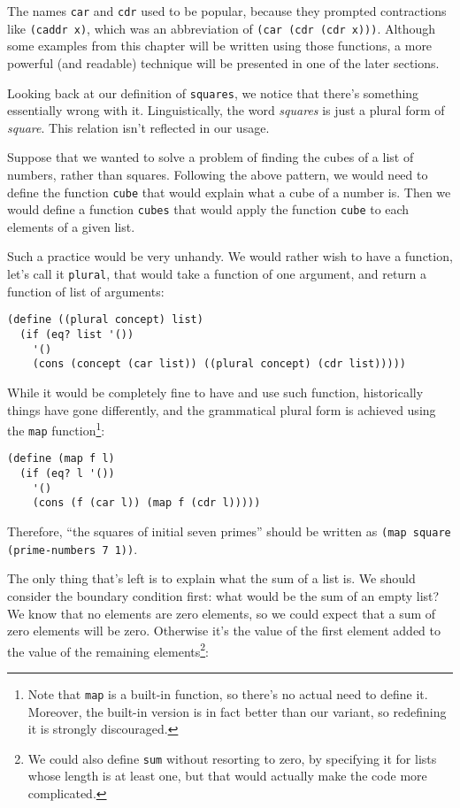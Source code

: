 The names \texttt{car} and \texttt{cdr} used to be popular, because
they prompted contractions like \texttt{(caddr x)}, which was an
abbreviation of \texttt{(car (cdr (cdr x)))}. Although some examples
from this chapter will be written using those functions, a more
powerful (and readable) technique will be presented in one of
the later sections.

Looking back at our definition of \texttt{squares}, we notice
that there's something essentially wrong with it. Linguistically,
the word \textit{squares} is just a plural form of \textit{square}.
This relation isn't reflected in our usage.

Suppose that we wanted to solve a problem of finding the cubes
of a list of numbers, rather than squares. Following the above
pattern, we would need to define the function \texttt{cube} that
would explain what a cube of a number is. Then we would define
a function \texttt{cubes} that would apply the function \texttt{cube}
to each elements of a given list.

Such a practice would be very unhandy. We would rather wish to
have a function, let's call it \texttt{plural}, that would take
a function of one argument, and return a function of list of
arguments:

\begin{Verbatim}[samepage=true]
(define ((plural concept) list)
  (if (eq? list '())
    '()
    (cons (concept (car list)) ((plural concept) (cdr list)))))
\end{Verbatim}

While it would be completely fine to have and use such function,
historically things have gone differently, and the grammatical plural
form is achieved using the \texttt{map} function\footnote{Note that
\texttt{map} is a built-in function, so there's no actual need to
define it. Moreover, the built-in version is in fact better than
our variant, so redefining it is strongly discouraged.}:

\begin{Verbatim}[samepage=true]
(define (map f l)
  (if (eq? l '())
    '()
    (cons (f (car l)) (map f (cdr l)))))
\end{Verbatim}

Therefore, ``the squares of initial seven primes'' should be written
as \texttt{(map square (prime-numbers 7 1))}.

The only thing that's left is to explain what the sum of a list is.
We should consider the boundary condition first: what would be the
sum of an empty list? We know that no elements are zero elements,
so we could expect that a sum of zero elements will be zero. Otherwise
it's the value of the first element added to the value of the
remaining elements\footnote{We could also define \texttt{sum}
without resorting to zero, by specifying it for lists whose length
is at least one, but that would actually make the code more
complicated.}:

